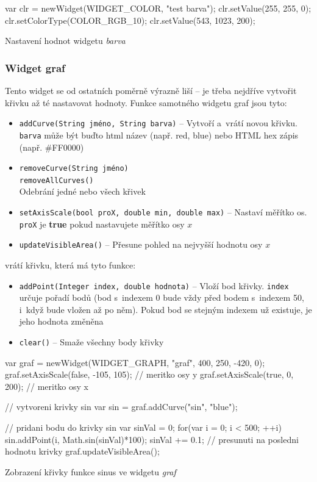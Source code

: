 \documentclass[12pt, a4paper, oneside]{article}
\newcommand{\It}{\textit}  %
\begin{document}
\begin{listing}[H]
\begin{jscode}
var clr = newWidget(WIDGET_COLOR, "test barva");
clr.setValue(255, 255, 0);
clr.setColorType(COLOR_RGB_10);
clr.setValue(543, 1023, 200);
\end{jscode}
\caption{Nastavení hodnot widgetu \It{barva}}
\end{listing}

\subsubsection*{Widget graf}
Tento widget se od ostatních poměrně výrazně liší -- je třeba nejdříve vytvořit křivku až té nastavovat hodnoty. Funkce samotného widgetu graf jsou tyto:
\begin{itemize}
    \item {\color{blue}\verb/addCurve(String jméno, String barva)/} -- Vytvoří a~vrátí novou křivku. \verb/barva/ může být buďto html název (např. red, blue) nebo HTML hex zápis (např. \#FF0000)
    \item {\color{blue}\verb/removeCurve(String jméno)/} \\
        {\color{blue}\verb/removeAllCurves()/} \\
        Odebrání jedné nebo všech křivek
    \item {\color{blue}\verb/setAxisScale(bool proX, double min, double max)/} -- Nastaví měřítko os. \verb/proX/ je {\bf true} pokud nastavujete měřítko osy $x$
    \item {\color{blue}\verb/updateVisibleArea()/} -- Přesune pohled na nejvyšší hodnotu osy $x$
\end{itemize}

 vrátí křivku, která má tyto funkce:

\begin{itemize}
    \item {\color{blue}\verb/addPoint(Integer index, double hodnota)/} -- Vloží bod křivky. \verb/index/ určuje pořadí bodů (bod s~indexem 0 bude vždy před bodem s~indexem 50, i~když bude vložen až po něm). Pokud bod se stejným indexem už existuje, je jeho hodnota změněna
    \item {\color{blue}\verb/clear()/} -- Smaže všechny body křivky
\end{itemize}

\begin{listing}[H]
\begin{jscode}
var graf = newWidget(WIDGET_GRAPH, "graf", 400, 250, -420, 0);
graf.setAxisScale(false, -105, 105); // meritko osy y
graf.setAxisScale(true, 0, 200); // meritko osy x

// vytvoreni krivky sin
var sin = graf.addCurve("sin", "blue"); 

// pridani bodu do krivky sin
var sinVal = 0;
for(var i = 0; i < 500; ++i) {
    sin.addPoint(i, Math.sin(sinVal)*100);
    sinVal += 0.1;
}
// presunuti na posledni hodnotu krivky
graf.updateVisibleArea(); 
\end{jscode}
\caption{Zobrazení křivky funkce sinus ve widgetu \It{graf}}
\end{listing}
\end{document}
